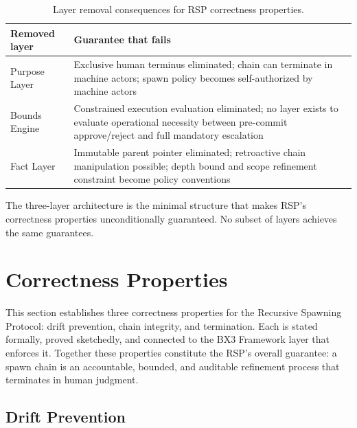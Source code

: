 \begin{table}[h]
\centering
\begin{tabular}{p{3.2cm} p{4.8cm}}
\toprule
\textbf{Removed layer} & \textbf{Guarantee that fails} \\
\midrule
Purpose Layer & Exclusive human terminus eliminated; chain can terminate in machine actors; spawn policy becomes self-authorized by machine actors \\
Bounds Engine & Constrained execution evaluation eliminated; no layer exists to evaluate operational necessity between pre-commit approve/reject and full mandatory escalation \\
Fact Layer & Immutable parent pointer eliminated; retroactive chain manipulation possible; depth bound and scope refinement constraint become policy conventions \\
\bottomrule
\end{tabular}
\caption{Layer removal consequences for RSP correctness properties.}
\label{tab:layer-minimality-rs}
\end{table}

The three-layer architecture is the minimal structure that makes RSP's correctness properties unconditionally guaranteed. No subset of layers achieves the same guarantees.

\section{Correctness Properties}
\label{sec:rs-correctness}

This section establishes three correctness properties for the Recursive Spawning Protocol: drift prevention, chain integrity, and termination. Each is stated formally, proved sketchedly, and connected to the BX3 Framework layer that enforces it. Together these properties constitute the RSP's overall guarantee: a spawn chain is an accountable, bounded, and auditable refinement process that terminates in human judgment.

\subsection{Drift Prevention}
\label{sec:rs-drift-prevention}

